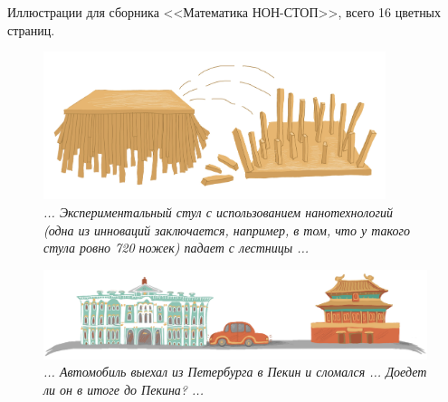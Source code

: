 \documentclass[10pt]{scrbook} \usepackage{modules/nonstahp_book}
\begin{document}
Иллюстрации для сборника <<Математика НОН-СТОП>>, всего 16 цветных страниц.

\vfill\eject

\begin{figure} \begin{center}
	\includegraphics[width=10cm]{figures/color/01c}
	\caption{
             {\itshape ... Экспериментальный стул с использованием нанотехнологий 
             (одна из инноваций заключается, например, в том, что у 
             такого стула ровно 720 ножек) падает с лестницы ...}\\
             }
\end{center} \end{figure}

\begin{figure} \begin{center}
	\includegraphics[width=12cm]{figures/color/15c}
	\caption{
             {\itshape ... Автомобиль выехал из Петербурга в Пекин и сломался ... %
             Доедет ли он в итоге до Пекина? ...}\\
             }
\end{center} \end{figure}
\end{document}
